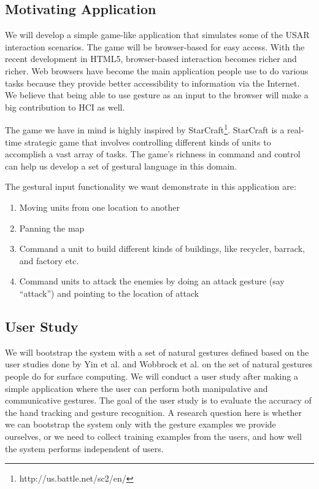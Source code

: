 \subsection{Motivating Application}
We will develop a simple game-like application that simulates some of the USAR
interaction scenarios. The game will be browser-based for easy access. With the
recent development in HTML5, browser-based interaction becomes richer and
richer. Web browsers have become the main application people use to do various
tasks because they provide better accessibility to information via the
Internet. We believe that being able to use gesture as an input to the browser
will make a big contribution to HCI as well.

The game we have in mind is highly inspired by
StarCraft\footnote{http://us.battle.net/sc2/en/}. StarCraft is a real-time
strategic game that involves controlling different kinds of units to accomplish
a vast array of tasks. The game's richness in command and control can help us develop a set of gestural language in this domain.

The gestural input functionality we want demonstrate in this application are:

\begin{enumerate}
  \item Moving units from one location to another
  \item Panning the map
  \item Command a unit to build different kinds of buildings, like recycler,
  barrack, and factory etc.
  \item Command units to attack the enemies by doing an attack gesture (say
  ``attack'') and pointing to the location of attack
\end{enumerate}

\subsection{User Study}\label{sec:user_study}
We will bootstrap the system with a set of natural gestures defined based on the
user studies done by Yin et al. \cite{yin10} and Wobbrock et al.
\cite{wobbrock09} on the set of natural gestures people do for surface
computing. We will conduct a user study after making a simple application where
the user can perform both manipulative and communicative gestures. The goal of 
the user study is to evaluate the accuracy of the hand tracking and gesture 
recognition. A research question here is whether we can bootstrap the system 
only with the gesture examples we provide ourselves, or we need to collect 
training examples from the users, and how well the system performs 
independent of users.

